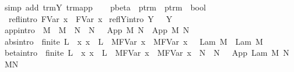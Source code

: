 \begin{isabellebody}
\ {\isacharparenleft}simp\ add{\isacharcolon}\ trm{\isachardot}Y\ trm{\isachardot}app{\isacharparenright}\isanewline
{}\isamarkupfalse%
%
\endisatagproof
{\isafoldproof}%
%
\isadelimproof
%
\endisadelimproof
%
\isamarkuptrue%
\isamarkupfalse%
\ \isanewline
\ \ pbeta\ {\isacharcolon}{\isacharcolon}\ {\isachardoublequoteopen}ptrm\ {\isasymRightarrow}\ ptrm\ {\isasymRightarrow}\ bool{\isachardoublequoteclose}\ {\isacharparenleft}{\isachardoublequoteopen}{\isacharunderscore}\ {\isasymggreater}\ {\isacharunderscore}{\isachardoublequoteclose}\ {\isacharbrackleft}{}{}{\isacharcomma}{}{}{\isacharbrackright}\ {}{}{\isacharparenright}\isanewline
{}\isanewline
\ \ refl{\isacharbrackleft}intro{\isacharbrackright}{\isacharcolon}\ {\isachardoublequoteopen}{\isacharparenleft}FVar\ x{\isacharparenright}\ {\isasymggreater}\ {\isacharparenleft}FVar\ x{\isacharparenright}{\isachardoublequoteclose}\isanewline
{\isacharbar}\ reflY{\isacharbrackleft}intro{\isacharbrackright}{\isacharcolon}\ {\isachardoublequoteopen}Y\ {\isasymsigma}\ {\isasymggreater}\ Y\ {\isasymsigma}{\isachardoublequoteclose}\isanewline
{\isacharbar}\ app{\isacharbrackleft}intro{\isacharbrackright}{\isacharcolon}\ {\isachardoublequoteopen}{\isasymlbrakk}\ M\ {\isasymggreater}\ M{\isacharprime}\ {\isacharsemicolon}\ N\ {\isasymggreater}\ N{\isacharprime}\ {\isasymrbrakk}\ {\isasymLongrightarrow}\ App\ M\ N\ {\isasymggreater}\ App\ M{\isacharprime}\ N{\isacharprime}{\isachardoublequoteclose}\isanewline
{\isacharbar}\ abs{\isacharbrackleft}intro{\isacharbrackright}{\isacharcolon}\ {\isachardoublequoteopen}{\isasymlbrakk}\ finite\ L\ {\isacharsemicolon}\ {\isacharparenleft}{\isasymAnd}x{\isachardot}\ x\ {\isasymnotin}\ L\ {\isasymLongrightarrow}\ M{\isacharcircum}{\isacharparenleft}FVar\ x{\isacharparenright}\ {\isasymggreater}\ M{\isacharprime}{\isacharcircum}{\isacharparenleft}FVar\ x{\isacharparenright}{\isacharparenright}\ {\isasymrbrakk}\ {\isasymLongrightarrow}\ Lam\ M\ {\isasymggreater}\ Lam\ M{\isacharprime}{\isachardoublequoteclose}\isanewline
{\isacharbar}\ beta{\isacharbrackleft}intro{\isacharbrackright}{\isacharcolon}\ {\isachardoublequoteopen}{\isasymlbrakk}\ finite\ L\ {\isacharsemicolon}\ {\isacharparenleft}{\isasymAnd}x{\isachardot}\ x\ {\isasymnotin}\ L\ {\isasymLongrightarrow}\ M{\isacharcircum}{\isacharparenleft}FVar\ x{\isacharparenright}\ {\isasymggreater}\ M{\isacharprime}{\isacharcircum}{\isacharparenleft}FVar\ x{\isacharparenright}{\isacharparenright}\ {\isacharsemicolon}\ N\ {\isasymggreater}\ N{\isacharprime}\ {\isasymrbrakk}\ {\isasymLongrightarrow}\ App\ {\isacharparenleft}Lam\ M{\isacharparenright}\ N\ {\isasymggreater}\ M{\isacharprime}{\isacharcircum}N{\isacharprime}{\isachardoublequoteclose}\isanewline

\end{isabellebody}
